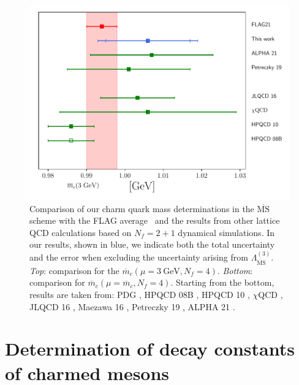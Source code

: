 \begin{figure}
	\centering
	\hspace{-0mm}
	\includegraphics[scale=0.6]{./cap6/figs/mc/mc_comparison_3gev.pdf}
	\caption{Comparison of our charm quark mass determinations in the $\overline{\textrm{MS}}$ scheme with the FLAG average~\cite{FlavourLatticeAveragingGroupFLAG:2021npn} and the results from other lattice QCD calculations based on $N_f=2+1$ dynamical simulations. In our results, shown in blue, we indicate both the total uncertainty and the error when excluding the uncertainty arising from $\Lambda^{(3)}_{\overline{\mathrm{MS}}}$. \textit{Top}: comparison for the  $\overline{m}_c(\mu=3\ \mathrm{GeV}, N_f=4)$. \textit{Bottom}: comparison for $\overline{m}_c(\mu=\overline{m}_c, N_f=4)$.  Starting from the bottom, results are taken from: PDG \cite{ParticleDataGroup:2022pth}, HPQCD 08B \cite{HPQCD:2008kxl}, HPQCD 10 \cite{McNeile:2010ji}, $\chi$QCD \cite{Yang:2014sea}, JLQCD 16 \cite{Nakayama:2016atf}, Maezawa 16 \cite{Maezawa:2016vgv}, Petreczky 19 \cite{Petreczky:2019ozv}, ALPHA 21 \cite{Heitger:2021apz}.
       }
	\label{fig:mc_comparison}
\end{figure}



\section{Determination of decay constants of charmed mesons}
\label{sec:fDs}

